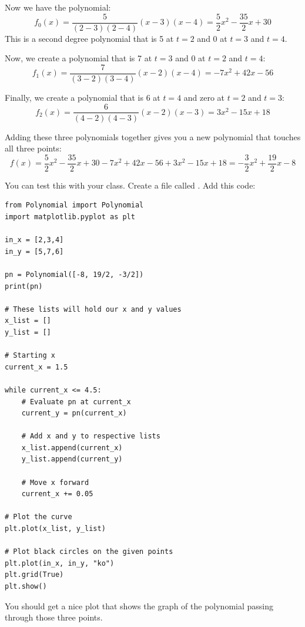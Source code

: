 Now we have the polynomial:
\begin{equation*}
f_0(x) = \frac{5}{(2 - 3)(2 - 4)}(x - 3)(x - 4) = \frac{5}{2}x^2 - \frac{35}{2}x + 30
\end{equation*}
This is a second degree polynomial that is 5 at $t=2$ and 0 at $t=3$ and $t=4$.

Now, we create a polynomial that is 7 at $t=3$ and 0 at $t= 2$ and $t=4$:
\begin{equation*}
f_1(x) = \frac{7}{(3 - 2)(3 - 4)}(x - 2)(x - 4) = -7x^2 +42x - 56
\end{equation*}

Finally, we create a polynomial that is 6 at $t=4$ and zero at $t=2$ and $t=3$:
\begin{equation*}
f_2(x) = \frac{6}{(4 - 2)(4 - 3)}(x - 2)(x - 3) = 3x^2 - 15x + 18
\end{equation*}

Adding these three polynomials together gives you a new polynomial that touches all three points:
\begin{equation*}
  f(x) = \frac{5}{2}x^2 - \frac{35}{2}x + 30  - 7x^2 + 42x - 56 + 3x^2 - 15x + 18  = -\frac{3}{2}x^2 + \frac{19}{2}x -8
\end{equation*}

You can test this with your  class. Create a file called . Add this code:
\begin{Verbatim}
from Polynomial import Polynomial
import matplotlib.pyplot as plt

in_x = [2,3,4]
in_y = [5,7,6]

pn = Polynomial([-8, 19/2, -3/2])
print(pn)

# These lists will hold our x and y values
x_list = []
y_list = []

# Starting x
current_x = 1.5

while current_x <= 4.5:
    # Evaluate pn at current_x
    current_y = pn(current_x)

    # Add x and y to respective lists
    x_list.append(current_x)
    y_list.append(current_y)

    # Move x forward
    current_x += 0.05
    
# Plot the curve
plt.plot(x_list, y_list)

# Plot black circles on the given points
plt.plot(in_x, in_y, "ko")
plt.grid(True)
plt.show()
\end{Verbatim}

You should get a nice plot that shows the graph of the polynomial
passing through those three points.

